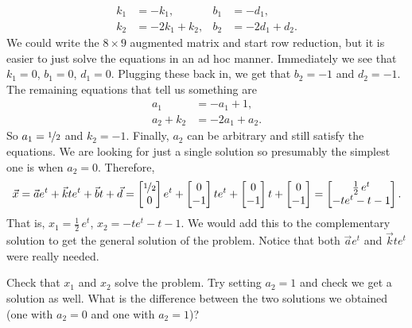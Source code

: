 \begin{exampleSol}
\begin{align*}
k_1 & = -k_1 , &
b_1 & = -d_1 , \\
k_2 & = -2k_1+k_2 , &
b_2 & = -2d_1+d_2 .
\end{align*}
We could write the $8 \times 9$ augmented matrix and start row
reduction, but it is easier to just solve the equations in an ad hoc
manner. Immediately we see that $k_1 = 0$, $b_1 = 0$, $d_1 = 0$.  Plugging
these
back in, we get that $b_2 = -1$ and $d_2 = -1$.  The remaining equations
that tell us something are
\begin{align*}
a_1 & = -a_1+1 , \\
a_2+k_2 & = -2a_1+a_2 .
\end{align*}
So $a_1 = \nicefrac{1}{2}$ and $k_2 = -1$.  Finally, $a_2$ can be arbitrary and still satisfy the
equations.  We are looking for just a single solution so presumably the
simplest
one is when $a_2 = 0$.
Therefore,
\begin{equation*}
\vec{x} = 
\vec{a}
e^{t}
+
\vec{k}
t
e^{t}
+
\vec{b}
t +
\vec{d}
=
\begin{bmatrix}
\nicefrac{1}{2} \\ 0
\end{bmatrix}
e^t
+
\begin{bmatrix}
0 \\ -1
\end{bmatrix}
te^t
+
\begin{bmatrix}
0 \\ -1
\end{bmatrix}
t
+
\begin{bmatrix}
0 \\ -1
\end{bmatrix}
=
\begin{bmatrix}
\frac{1}{2}\,e^t \\
-te^t - t - 1
\end{bmatrix} .
\end{equation*}
That is, $x_1 = \frac{1}{2}\,e^t$, $x_2 = 
-te^t - t - 1$.  We would add this to the complementary solution to get the
general solution of the problem.  Notice that both $\vec{a} e^t$
and $\vec{k} te^t$ were really needed.
\end{exampleSol}

\begin{exercise}
Check that $x_1$ and $x_2$ solve the problem.  Try setting $a_2 = 1$
and check we get a solution as well.  What is the difference between the two
solutions we obtained (one with $a_2=0$ and one with $a_2=1$)?
\end{exercise}

